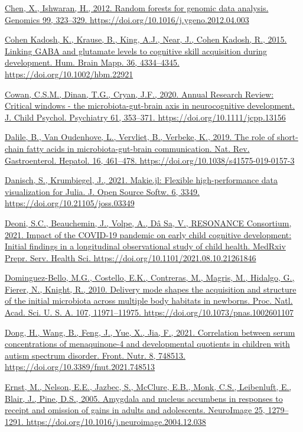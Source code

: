 \documentclass[
]{article}
\begin{document}
\href{https://www.zotero.org/google-docs/?uydJ8e}{Chen, X., Ishwaran,
H., 2012. Random forests for genomic data analysis. Genomics 99,
323--329. https://doi.org/10.1016/j.ygeno.2012.04.003}

\href{https://www.zotero.org/google-docs/?uydJ8e}{Cohen Kadosh, K.,
Krause, B., King, A.J., Near, J., Cohen Kadosh, R., 2015. Linking GABA
and glutamate levels to cognitive skill acquisition during development.
Hum. Brain Mapp. 36, 4334--4345. https://doi.org/10.1002/hbm.22921}

\href{https://www.zotero.org/google-docs/?uydJ8e}{Cowan, C.S.M., Dinan,
T.G., Cryan, J.F., 2020. Annual Research Review: Critical windows - the
microbiota-gut-brain axis in neurocognitive development. J. Child
Psychol. Psychiatry 61, 353--371. https://doi.org/10.1111/jcpp.13156}

\href{https://www.zotero.org/google-docs/?uydJ8e}{Dalile, B., Van
Oudenhove, L., Vervliet, B., Verbeke, K., 2019. The role of short-chain
fatty acids in microbiota-gut-brain communication. Nat. Rev.
Gastroenterol. Hepatol. 16, 461--478.
https://doi.org/10.1038/s41575-019-0157-3}

\href{https://www.zotero.org/google-docs/?uydJ8e}{Danisch, S.,
Krumbiegel, J., 2021. Makie.jl: Flexible high-performance data
visualization for Julia. J. Open Source Softw. 6, 3349.
https://doi.org/10.21105/joss.03349}

\href{https://www.zotero.org/google-docs/?uydJ8e}{Deoni, S.C.,
Beauchemin, J., Volpe, A., Dâ Sa, V., RESONANCE Consortium, 2021. Impact
of the COVID-19 pandemic on early child cognitive development: Initial
findings in a longitudinal observational study of child health. MedRxiv
Prepr. Serv. Health Sci. https://doi.org/10.1101/2021.08.10.21261846}

\href{https://www.zotero.org/google-docs/?uydJ8e}{Dominguez-Bello, M.G.,
Costello, E.K., Contreras, M., Magris, M., Hidalgo, G., Fierer, N.,
Knight, R., 2010. Delivery mode shapes the acquisition and structure of
the initial microbiota across multiple body habitats in newborns. Proc.
Natl. Acad. Sci. U. S. A. 107, 11971--11975.
https://doi.org/10.1073/pnas.1002601107}

\href{https://www.zotero.org/google-docs/?uydJ8e}{Dong, H., Wang, B.,
Feng, J., Yue, X., Jia, F., 2021. Correlation between serum
concentrations of menaquinone-4 and developmental quotients in children
with autism spectrum disorder. Front. Nutr. 8, 748513.
https://doi.org/10.3389/fnut.2021.748513}

\href{https://www.zotero.org/google-docs/?uydJ8e}{Ernst, M., Nelson,
E.E., Jazbec, S., McClure, E.B., Monk, C.S., Leibenluft, E., Blair, J.,
Pine, D.S., 2005. Amygdala and nucleus accumbens in responses to receipt
and omission of gains in adults and adolescents. NeuroImage 25,
1279--1291. https://doi.org/10.1016/j.neuroimage.2004.12.038}
\end{document}
